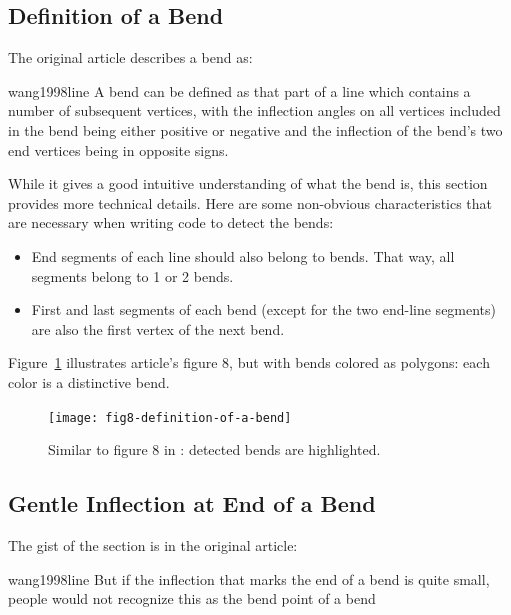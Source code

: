 \documentclass[a4paper]{article}
\begin{document}
\subsection{Definition of a Bend}
\label{sec:definition-of-a-bend}

The original article describes a bend as:

\begin{displaycquote}{wang1998line}
    A bend can be defined as that part of a line which contains a number of
    subsequent vertices, with the inflection angles on all vertices included in
    the bend being either positive or negative and the inflection of the bend's
    two end vertices being in opposite signs.
\end{displaycquote}

While it gives a good intuitive understanding of what the bend is, this section
provides more technical details. Here are some non-obvious characteristics that
are necessary when writing code to detect the bends:

\begin{itemize}
    \item End segments of each line should also belong to bends. That way, all
        segments belong to 1 or 2 bends.

    \item First and last segments of each bend (except for the two end-line
        segments) are also the first vertex of the next bend.
\end{itemize}

Figure~\ref{fig:fig8-definition-of-a-bend} illustrates article's figure 8,
but with bends colored as polygons: each color is a distinctive bend.

\begin{figure}[ht]
    \centering
    \texttt{[image: fig8-definition-of-a-bend]}

    \caption{Similar to figure 8 in \cite{wang1998line}: detected bends are
    highlighted.}

    \label{fig:fig8-definition-of-a-bend}
\end{figure}

\subsection{Gentle Inflection at End of a Bend}

The gist of the section is in the original article:

\begin{displaycquote}{wang1998line}
    But if the inflection that marks the end of a bend is quite small, people
    would not recognize this as the bend point of a bend
\end{displaycquote}
\end{document}
